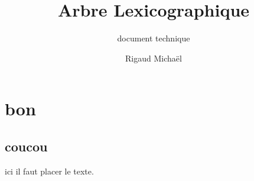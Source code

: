 \documentclass[a4paper, 11pt, oneside]{memoir}
\title{Arbre Lexicographique}
\subtitle{ document technique}
\author{Rigaud Michaël}
\newcommand{\chaptere}[1]{\newpage\begin{center}\couleurr{\rule{\linewidth}{0.5mm}}\\
\LARGE\textbf{\couleurr{#1}}\\%
\couleurr{\rule{\linewidth}{0.5mm}}\\\vspace{1cm}\end{center}%
\addcontentsline{toc}{part}{~~~~~~#1}}
\newcommand{\partie}[1]{\newpage\begin{center}\HUGE\bfseries%
\couleurb{#1}\\\end{center}%
\addcontentsline{toc}{part}{~~~~~~#1}}
\newcounter{th}[chapter]
\newcommand\couleurb[1]{\textcolor{SteelBlue}{#1}}
\newcommand\couleurr[1]{\textcolor{DarkRed}{#1}}
\begin{document}
\maketitle
\thispagestyle{empty}
\newpage

\tableofcontents



\newpage	  

\part{bon}
\chapter{coucou}
ici il faut placer le texte.


\newpage


\appendix
%
\newpage
 \listoffigures
 
  
\end{document}
